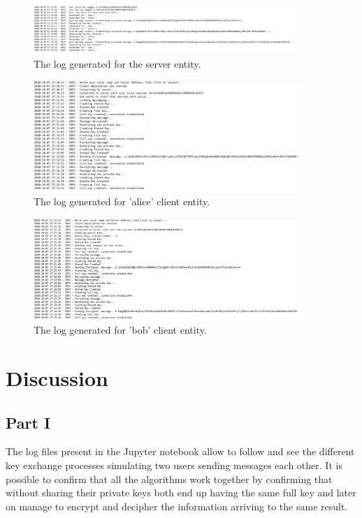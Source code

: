\documentclass[letterpaper,12pt]{article}
\begin{document}
\begin{figure}[H]
    \centering
    \includegraphics[width=0.9\textwidth]{assets/server_log.png}
    \caption{The log generated for the server entity.}
    \label{fig:SRV}
\end{figure}
\begin{figure}[H]
    \centering
    \includegraphics[width=0.9\textwidth]{assets/alice_log.png}
    \caption{The log generated for 'alice' client entity.}
    \label{fig:ALC}
\end{figure}
\begin{figure}[H]
    \centering
    \includegraphics[width=0.9\textwidth]{assets/bob_log.png}
    \caption{The log generated for 'bob' client entity.}
    \label{fig:BOB}
\end{figure}


\section{Discussion}
\subsection{Part I}
The log files present in the Jupyter notebook allow to follow and see the different key exchange processes simulating two users sending messages each other. 
It is possible to confirm that all the algorithms work together by confirming that without sharing their private keys both end up having the same full key and later on manage to encrypt and decipher the information arriving to the same result.
\end{document}
